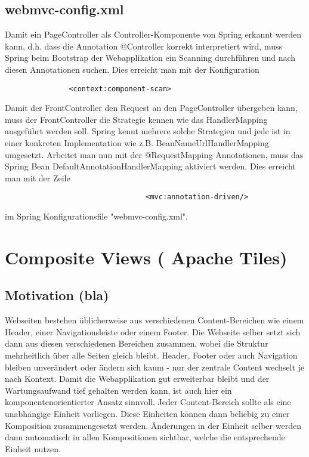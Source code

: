 \documentclass[a4paper,10pt]{scrreprt}
\begin{document}
\section{webmvc-config.xml}
Damit ein PageController als Controller-Komponente von Spring erkannt werden kann, d.h. dass die
Annotation @Controller korrekt interpretiert wird, muss Spring beim Bootstrap der Webapplikation
ein Scanning durchführen und nach diesen Annotationen suchen. Dies erreicht man mit der
Konfiguration \begin{verbatim}
               <context:component-scan>
              \end{verbatim}
Damit der FrontController den Request an den PageController übergeben kann, muss der
FrontController die Strategie kennen wie das HandlerMapping ausgeführt werden soll. Spring kennt
mehrere solche Strategien und jede ist in einer konkreten Implementation wie z.B.
BeanNameUrlHandlerMapping umgesetzt. Arbeitet man nun mit der @RequestMapping
Annotationen, muss das Spring Bean DefaultAnnotationHandlerMapping aktiviert werden.
Dies erreicht man mit der Zeile \begin{verbatim}
                                 <mvc:annotation-driven/>
                                \end{verbatim}
 im Spring Konfigurationsfile
"webmvc-config.xml".

\chapter{Composite Views ( Apache Tiles)}

\section{Motivation (bla)}
Webseiten bestehen üblicherweise aus verschiedenen Content-Bereichen wie einem Header, einer
Navigationsleiste oder einem Footer. Die Webseite selber setzt sich dann aus diesen verschiedenen
Bereichen zusammen, wobei die Struktur mehrheitlich über alle Seiten gleich bleibt. Header, Footer
oder auch Navigation bleiben unverändert oder ändern sich kaum - nur der zentrale Content
wechselt je nach Kontext.
Damit die Webapplikation gut erweiterbar bleibt und der Wartungsaufwand tief gehalten werden
kann, ist auch hier ein komponentenorientierter Ansatz sinnvoll. Jeder Content-Bereich sollte als
eine unabhängige Einheit vorliegen. Diese Einheiten können dann beliebig zu einer Komposition
zusammengesetzt werden. Änderungen in der Einheit selber werden dann automatisch in allen
Kompositionen sichtbar, welche die entsprechende Einheit nutzen.
\end{document}
